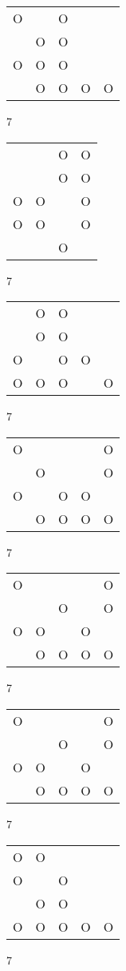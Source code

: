 \begin{tabular}{|m{0.2cm}m{0.2cm}m{0.2cm}m{0.2cm}m{0.2cm}|}\hline
O& &O& & \\
 &O&O& & \\
O&O&O& & \\
 &O&O&O&O\\
\hline\end{tabular}7
\begin{tabular}{|m{0.2cm}m{0.2cm}m{0.2cm}m{0.2cm}|}\hline
 & &O&O\\
 & &O&O\\
O&O& &O\\
O&O& &O\\
 & &O& \\
\hline\end{tabular}7
\begin{tabular}{|m{0.2cm}m{0.2cm}m{0.2cm}m{0.2cm}m{0.2cm}|}\hline
 &O&O& & \\
 &O&O& & \\
O& &O&O& \\
O&O&O& &O\\
\hline\end{tabular}7
\begin{tabular}{|m{0.2cm}m{0.2cm}m{0.2cm}m{0.2cm}m{0.2cm}|}\hline
O& & & &O\\
 &O& & &O\\
O& &O&O& \\
 &O&O&O&O\\
\hline\end{tabular}7
\begin{tabular}{|m{0.2cm}m{0.2cm}m{0.2cm}m{0.2cm}m{0.2cm}|}\hline
O& & & &O\\
 & &O& &O\\
O&O& &O& \\
 &O&O&O&O\\
\hline\end{tabular}7
\begin{tabular}{|m{0.2cm}m{0.2cm}m{0.2cm}m{0.2cm}m{0.2cm}|}\hline
O& & & &O\\
 & &O& &O\\
O&O& &O& \\
 &O&O&O&O\\
\hline\end{tabular}7
\begin{tabular}{|m{0.2cm}m{0.2cm}m{0.2cm}m{0.2cm}m{0.2cm}|}\hline
O&O& & & \\
O& &O& & \\
 &O&O& & \\
O&O&O&O&O\\
\hline\end{tabular}7
